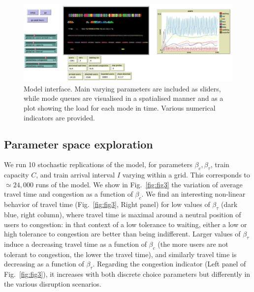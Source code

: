 \documentclass[10pt]{article}
\begin{document}
\begin{figure}%
\begin{mdframed}
\centerline{\includegraphics[width=\linewidth]{Fig2.png}}
\end{mdframed}
\caption{Model interface. Main varying parameters are included as sliders, while mode queues are visualised in a spatialised manner and as a plot showing the load for each mode in time. Various numerical indicators are provided.\label{fig:fig2}}
\end{figure}

\subsection{Parameter space exploration}

We run 10 stochastic replications of the model, for parameters $\beta_c,\beta_{\tau}$, train capacity $C$, and train arrival interval $I$ varying within a grid. This corresponds to $\simeq 24,000$ runs of the model. We show in Fig.~\ref{fig:fig3} the variation of average travel time and congestion as a function of $\beta_c$. We find an interesting non-linear behavior of travel time (Fig.~\ref{fig:fig3}, Right panel) for low values of $\beta_{\tau}$ (dark blue, right column), where travel time is maximal around a neutral position of users to congestion: in that context of a low tolerance to waiting, either a low or high tolerance to congestion are better than being indifferent. Larger values of $\beta_{\tau}$ induce a decreasing travel time as a function of $\beta_c$ (the more users are not tolerant to congestion, the lower the travel time), and similarly travel time is decreasing as a function of $\beta_{\tau}$. Regarding the congestion indicator (Left panel of Fig.~\ref{fig:fig3}), it increases with both discrete choice parameters but differently in the various disruption scenarios.
\end{document}
